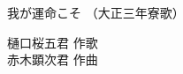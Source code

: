 \documentclass[10pt,b5j]{tarticle} %
\begin{document}
\begin{minipage}[c]{0.7\hsize} %
    \begin{center}
        {\LARGE
            我が運命こそ %
        }
        {\small 
            （大正三年寮歌） %
        }
    \end{center}
\end{minipage}
\begin{minipage}[c]{0.3\hsize} %
    \begin{flushright} %
        樋口桜五君 作歌\\赤木顕次君 作曲 %
    \end{flushright}
\end{minipage}
\end{document}
